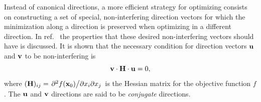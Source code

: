 Instead of canonical directions, a more efficient strategy for optimizing consists on constructing a set of special, non-interfering direction vectors for which the minimization along a direction is preserved when optimizing in a different direction.
In ref.~\cite{press_numerical_2007} the properties that these desired non-interfering vectors should have is discussed. It is shown that the necessary condition for direction vectors $\vb{u}$ and $\vb{v}$ to be non-interfering is
\begin{equation}
    \vb{v}\cdot\vb{H}\cdot\vb{u}=0,
\end{equation}
where $(\vb{H})_{ij} = \pdv*{f(\vb{x}_0)}{x_i}{x_j}$ is the Hessian matrix for the objective function $f$. The $\vb{u}$ and $\vb{v}$ directions are said to be \textit{conjugate} directions.

